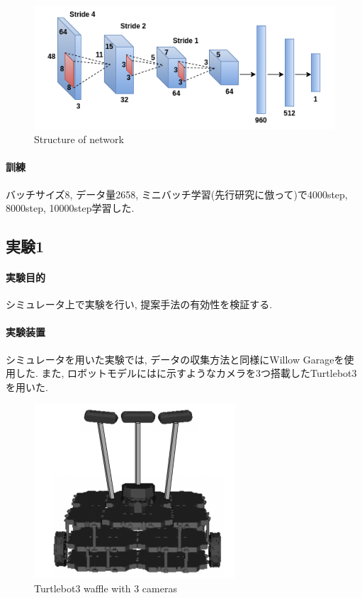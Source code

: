 \vspace{5mm}
\begin{figure}[h]
  \centering
  \includegraphics[keepaspectratio, scale=0.6]{images/cnn.png}
  \caption{Structure of network}
  \label{Fig:cnn}
  \end{figure}

\paragraph{訓練}
バッチサイズ8, データ量2658, ミニバッチ学習(先行研究に倣って)で4000step, 8000step, 10000step学習した.

\subsection{実験1}
\paragraph{実験目的}
シミュレータ上で実験を行い, 提案手法の有効性を検証する.

\paragraph{実験装置}
シミュレータを用いた実験では, データの収集方法と同様にWillow Garageを使用した. また, ロボットモデルにはに示すようなカメラを3つ搭載したTurtlebot3を用いた. 

\begin{figure}[h]
  \centering
  \includegraphics[keepaspectratio, scale=0.55]{images/turtlebot3.png}
  \caption{Turtlebot3 waffle with 3 cameras}
  \label{Fig:turtlebot3}
  \end{figure}


